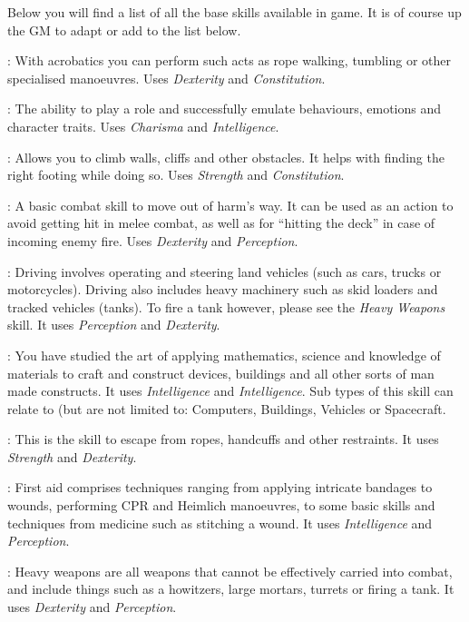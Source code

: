 Below you will find a list of all the base skills available in game. It is of
course up the GM to adapt or add to the list below.

: With acrobatics you can perform such acts as rope walking,
tumbling or other specialised manoeuvres. Uses \emph{Dexterity} and
\emph{Constitution}.

: The ability to play a role and successfully emulate behaviours,
emotions and character traits. Uses \emph{Charisma} and \emph{Intelligence}.

: Allows you to climb walls, cliffs and other obstacles. It helps
with finding the right footing while doing so. Uses \emph{Strength} and
\emph{Constitution}.

: A basic combat skill to move out of harm's way. It can be used
as an action to avoid getting hit in melee combat, as well as for ``hitting the
deck'' in case of incoming enemy fire. Uses \emph{Dexterity} and
\emph{Perception}.

: Driving involves operating and steering land vehicles (such as
cars, trucks or motorcycles). Driving also includes heavy machinery such as
skid loaders and tracked vehicles (tanks). To fire a tank however, please see
the \emph{Heavy Weapons} skill. It uses \emph{Perception} and \emph{Dexterity}.

: You have studied the art of applying
mathematics, science and knowledge of materials to craft and construct
devices, buildings and all other sorts of man made constructs. It uses
\emph{Intelligence} and \emph{Intelligence}. Sub types of this skill can
relate to (but are not limited to: Computers, Buildings, Vehicles or
Spacecraft.

: This is the skill to escape from ropes, handcuffs and
other restraints. It uses \emph{Strength} and \emph{Dexterity}.

: First aid comprises techniques ranging from applying
intricate bandages to wounds, performing CPR and Heimlich manoeuvres, to some
basic skills and techniques from medicine such as stitching a wound. It uses
\emph{Intelligence} and \emph{Perception}.

: Heavy weapons are all weapons that cannot be effectively
carried into combat, and include things such as a howitzers, large mortars,
turrets or firing a tank. It uses \emph{Dexterity} and \emph{Perception}.

